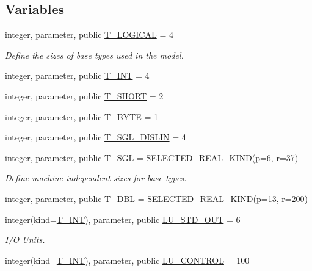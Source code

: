 \subsection*{Variables}
\begin{DoxyCompactItemize}
\item 
integer, parameter, public \hyperlink{namespacetypes_adfa8f4f6096bb7bdbb93f36b911dcaad}{T\_\-LOGICAL} = 4
\begin{DoxyCompactList}\small\item\em Define the sizes of base types used in the model. \item\end{DoxyCompactList}\item 
integer, parameter, public \hyperlink{namespacetypes_a4e4d040a4425196c4d43be63e7e6103a}{T\_\-INT} = 4
\item 
integer, parameter, public \hyperlink{namespacetypes_af6b9654915a854564cb3f5ded061addc}{T\_\-SHORT} = 2
\item 
integer, parameter, public \hyperlink{namespacetypes_ac6380d8d9107c7fce9504b0b13552570}{T\_\-BYTE} = 1
\item 
integer, parameter, public \hyperlink{namespacetypes_a878c8056dbab71b170f5f7c4c9dd2235}{T\_\-SGL\_\-DISLIN} = 4
\item 
integer, parameter, public \hyperlink{namespacetypes_af3012489af4c138f271f1bce244b7e51}{T\_\-SGL} = SELECTED\_\-REAL\_\-KIND(p=6, r=37)
\begin{DoxyCompactList}\small\item\em Define machine-\/independent sizes for base types. \item\end{DoxyCompactList}\item 
integer, parameter, public \hyperlink{namespacetypes_a888737411068474a167b1c3e5b579c58}{T\_\-DBL} = SELECTED\_\-REAL\_\-KIND(p=13, r=200)
\item 
integer(kind=\hyperlink{namespacetypes_a4e4d040a4425196c4d43be63e7e6103a}{T\_\-INT}), parameter, public \hyperlink{namespacetypes_ad3e7016ccd6fed062fbd4bf477b66a81}{LU\_\-STD\_\-OUT} = 6
\begin{DoxyCompactList}\small\item\em I/O Units. \item\end{DoxyCompactList}\item 
integer(kind=\hyperlink{namespacetypes_a4e4d040a4425196c4d43be63e7e6103a}{T\_\-INT}), parameter, public \hyperlink{namespacetypes_acebd133f6b8d69d9ba284172dfba9388}{LU\_\-CONTROL} = 100

\end{DoxyCompactItemize}
